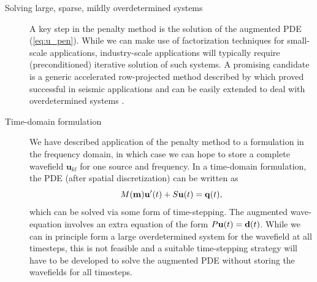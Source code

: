 \documentclass{iopart}
\begin{document}
\begin{description}

\item[Solving large, sparse, mildly overdetermined systems] 
A key step in the penalty method is the solution of the augmented PDE
(\ref{eq:u_pen}). While we can make use of factorization techniques for
small-scale applications, industry-scale applications will typically
require (preconditioned) iterative solution of such systems. A promising
candidate is a generic accelerated row-projected method described by
\cite{Bjorck1979,Gordon2013} which proved successful in seismic
applications and can be easily extended to deal with overdetermined
systems \cite{Censor1983}.

\item[Time-domain formulation]
We have described application of the penalty method to a formulation in
the frequency domain, in which case we can hope to store a complete
wavefield $\mathbf{u}_{kl}$ for one source and frequency. In a
time-domain formulation, the PDE (after spatial discretization) can be
written as
 \[
 M(\mathbf{m})\mathbf{u}'(t) + S\mathbf{u}(t) = \mathbf{q}(t),
 \]
which can be solved via some form of time-stepping. The augmented
wave-equation involves an extra equation of the form $P\mathbf{u}(t) =
\mathbf{d}(t)$. While we can in principle form a large overdetermined system
for the wavefield at all timesteps, this is not feasible and a suitable
time-stepping strategy will have to be developed to solve the augmented
PDE without storing the wavefields for all timesteps.


\end{description}
\end{document}
